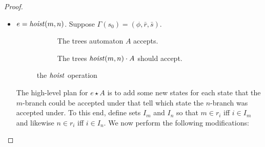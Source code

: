 \begin{proof}
\begin{itemize}

\item $e=\mathit{hoist}(m,n)$. Suppose $\Gamma(s_0)=(\phi,\bar r,\bar s)$.
\begin{figure}
    \begin{center}
        \begin{subfigure}[b]{0.4\textwidth}
            \begin{center}
            \end{center}
            \caption{The trees automaton $A$ accepts.}
            \label{fig:hoist-input}
        \end{subfigure}
        \begin{subfigure}[b]{0.4\textwidth}
            \begin{center}
            \end{center}
            \caption{The trees $\mathit{hoist}(m,n)\cdot A$ should accept.}
            \label{fig:hoist-output}
        \end{subfigure}
    \end{center}
    \caption{the $\mathit{hoist}$ operation}
    \label{fig:hoist}
\end{figure}
The high-level plan for $e\star A$ is to add some new states for each state that the
$m$-branch could be accepted under that tell which state the $n$-branch was
accepted under. To this end, define sets $I_m$ and $I_n$ so that $m \in r_i$
iff $i \in I_m$ and likewise $n \in r_i$ iff $i \in I_n$. We now perform the
following modifications:


\end{itemize}
\end{proof}
